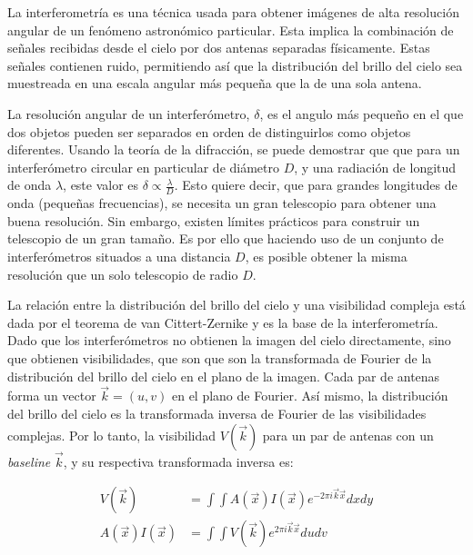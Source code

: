 La interferometría es una técnica usada para obtener imágenes de alta resolución angular de un fenómeno astronómico particular. Esta implica la combinación de señales recibidas desde el cielo por dos antenas separadas físicamente. Estas señales contienen ruido, permitiendo así que la distribución del brillo del cielo sea muestreada en una escala angular más pequeña que la de una sola antena. 

La resolución angular de un interferómetro, $\delta$, es el angulo más pequeño en el que dos objetos pueden ser separados en orden de distinguirlos como objetos diferentes. Usando la teoría de la difracción, se puede demostrar que que para un interferómetro circular en particular de diámetro $D$, y una radiación de longitud de onda $\lambda$, este valor es $\delta \propto \frac{\lambda}{D}$. Esto quiere decir, que para grandes longitudes de onda (pequeñas frecuencias), se necesita un gran telescopio para obtener una buena resolución. Sin embargo, existen límites prácticos para construir un telescopio de un gran tamaño. Es por ello que haciendo uso de un conjunto de interferómetros situados a una distancia $D$, es posible obtener la misma resolución que un solo telescopio de radio $D$.



La relación entre la distribución del brillo del cielo y una visibilidad compleja está dada por el teorema de van Cittert-Zernike \citep{zernike} y es la base de la interferometría. Dado que los interferómetros no obtienen la imagen del cielo directamente, sino que obtienen visibilidades, que son que son la transformada de Fourier de la distribución del brillo del cielo en el plano de la imagen. Cada par de antenas forma un vector $\vec{k} = (u,v)$ en el plano de Fourier. Así mismo, la distribución del brillo del cielo es la transformada inversa de Fourier de las visibilidades complejas. Por lo tanto, la visibilidad $V(\vec{k})$ para un par de antenas con un \textit{baseline} $\vec{k}$, y su respectiva transformada inversa es:


\begin{align}
V(\vec{k}) &= \int\int A(\vec{x})I(\vec{x})e^{-2\pi i\vec{k}\vec{x}}dxdy \\
A(\vec{x})I(\vec{x}) &= \int\int V(\vec{k})e^{2\pi i\vec{k}\vec{x}}dudv
\end{align}

